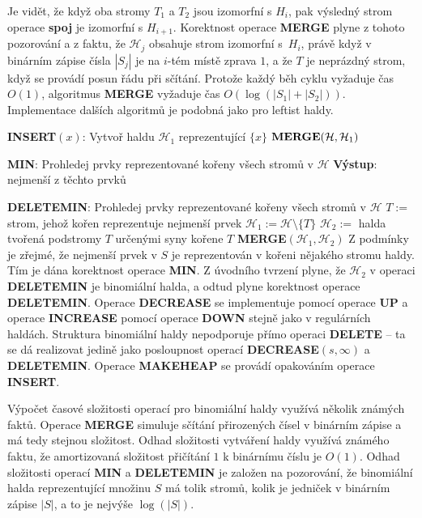 \documentclass[a4paper,12pt]{article}
\begin{document}
Je vidět, že když oba stromy $T_1$ a $T_2$ jsou izomorfní 
s $H_i$, pak výsledný strom operace {\bf spoj} je izomorfní 
s $H_{i+1}$. Korektnost ope\-race {\bf MERGE} plyne z tohoto 
pozorování a z faktu, že $\mathcal H_j$ obsahuje strom izomorfní s~$H_i$, právě když v binárním zápise čísla $
|S_j|$ je na $i$-tém 
místě zprava $1$, a že $T$ je neprázdný strom, když se 
provádí posun řádu při sčítání. Protože každý běh 
cyklu vyžaduje čas $O(1)$, algoritmus {\bf MER\-GE} vyžaduje čas 
$O(\log(|S_1|+|S_2|))$. Implementace dalších algoritmů 
je podobná jako pro leftist haldy. 

{\bf INSERT$(x)$}:\newline 
Vytvoř haldu $\mathcal H_1$ reprezentující $\{x\}$\newline 
$\bold M\bold E\bold R\bold G\bold E(\mathcal H,\mathcal H_1)$

{\bf MIN}:\newline 
Prohledej prvky reprezentované kořeny všech stromů 
v $\mathcal H$\newline 
{\bf Výstup}: nejmenší z těchto prvků  

{\bf DELETEMIN}:\newline 
Prohledej prvky reprezentované kořeny všech stromů 
v $\mathcal H$\newline 
$T:=$ strom, jehož kořen reprezentuje nejmenší prvek\newline 
$\mathcal H_1:=\mathcal H\setminus \{T\}$\newline 
$\mathcal H_2:=$ halda tvořená podstromy $T$ určenými syny kořene $
T$\newline 
{\bf MERGE$(\mathcal H_1,\mathcal H_2)$
}
Z podmínky  je zřejmé, že 
nejmenší prvek v $S$ je reprezentován v kořeni nějakého  
stromu haldy. Tím je dána korekt\-nost operace {\bf MIN}.
Z úvodního tvrzení plyne, že $\mathcal H_2$ v operaci {\bf DELE\-TE\-MIN} je 
binomiální halda, a odtud plyne korekt\-nost ope\-race 
{\bf DE\-LE\-TEMIN}. Operace {\bf DECREASE} se implementuje pomocí 
ope\-race {\bf UP} a ope\-race {\bf INCREASE} pomocí 
operace {\bf DOWN} stejně jako v regulárních haldách. 
Struktura binomiální haldy nepodporuje přímo operaci 
{\bf DELETE} -- ta se dá realizovat jedině jako posloupnost 
operací {\bf DECREASE$(s,\infty )$} a {\bf DELETEMIN}.  
Operace {\bf MAKEHEAP} se provádí opakováním operace {\bf INSERT}.

Výpočet časové složitosti operací pro binomiální haldy 
využívá několik známých faktů.  Ope\-race {\bf MERGE }
simuluje sčítání přirozených čísel v binárním zápise a má 
tedy stejnou složitost.  Odhad složitosti vytváření haldy využívá 
známého faktu, že amortizovaná složitost přičítání $
1$  
k binárnímu číslu je $O(1)$.  
Odhad složitosti operací {\bf MIN} a {\bf DELETEMIN} je založen na 
pozorování, že binomiální halda reprezentující množinu $
S$ má 
tolik stromů, kolik je jedniček v binárním zápise $
|S|$, a 
to je nejvýše $\log(|S|)$.  
\end{document}
